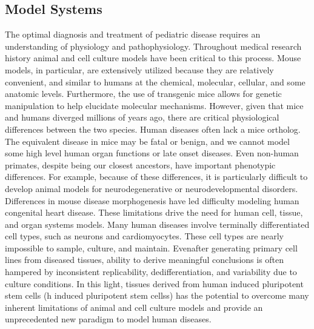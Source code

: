 \documentclass[sigconf]{acmart}
\begin{document}
\subsection{Model Systems}
    The optimal diagnosis and treatment of pediatric disease requires an understanding of
physiology and pathophysiology. Throughout medical research history animal and cell culture
models have been critical to this process. Mouse models, in particular, are extensively utilized
because they are relatively convenient, and similar to humans at the chemical, molecular,
cellular, and some anatomic levels. Furthermore, the use of transgenic mice allows for genetic
manipulation to help elucidate molecular mechanisms. However, given that mice and humans
diverged millions of years ago, there are critical physiological differences between the two
species.
Human diseases often lack a mice ortholog. The equivalent disease in mice may be fatal
or benign, and we cannot model some high level human organ functions or late onset diseases.
Even non-human primates, despite being our closest ancestors, have important phenotypic
differences. For example, because of these differences, it is particularly difficult to develop
animal models for neurodegenerative or neurodevelopmental disorders. Differences in
mouse disease morphogenesis have led difficulty modeling human congenital heart disease. These limitations drive the need for human cell, tissue, and organ systems models. 
Many human diseases involve terminally differentiated cell types, such as neurons and cardiomyocytes. These cell types are nearly impossible to sample, culture, and maintain. Evenafter generating primary cell lines from diseased tissues, ability to derive meaningful conclusions
is often hampered by inconsistent replicability, dedifferentiation, and variability due to culture
conditions. In this light, tissues derived from human induced pluripotent stem cells (h induced pluripotent stem cellss) has
the potential to overcome many inherent limitations of animal and cell culture models and
provide an unprecedented new paradigm to model human diseases.
    
\end{document}
